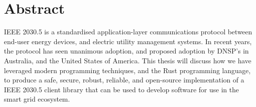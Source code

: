 \chapter*{Abstract}\label{abstract}
IEEE 2030.5 is a standardised application-layer communications protocol between end-user energy devices, and electric utility management systems. In recent years, the protocol has seen unanimous adoption, and proposed adoption by DNSP's in Australia, and the United States of America.
This thesis will discuss how we have leveraged modern programming techniques, and the Rust programming language, to produce a safe, secure, robust, reliable, and open-source implementation of a IEEE 2030.5 client library that can be used to develop software for use in the smart grid ecosystem.
